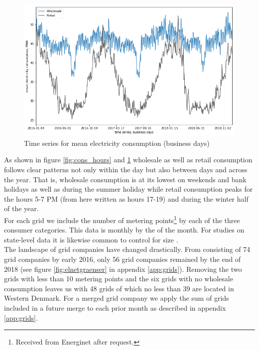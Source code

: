 \begin{figure}[H]
  \centering
  \caption{Time series for mean electricity consumption (business days)}
  \label{fig:cons_time_series}
  \includegraphics[width=1 \textwidth]{03_figures/cons_time series, business days}
\end{figure}
\noindent
As shown in figure \ref{fig:cons_hours} and \ref{fig:cons_time_series} wholesale as well as retail consumption follows clear patterns not only within the day but also between days and across the year. That is, wholesale consumption is at its lowest on weekends and bank holidays as well as during the summer holiday while retail consumption peaks for the hours 5-7 PM (from here written as hours 17-19) and during the winter half of the year.
\medskip\\
For each grid we include the number of metering points\footnote{Received from Energinet after request.} by each of the three consumer categories. This data is monthly by the  of the month. For studies on state-level data it is likewise common to control for size \citep{burke2017price}.
\medskip\\
The landscape of grid companies have changed drastically. From consisting of 74 grid companies by early 2016, only 56 grid companies remained by the end of 2018 (see figure \ref{fig:elnetgraenser} in appendix \ref{app:grids}). Removing the two grids with less than 10 metering points and the six grids with no wholesale consumption leaves us with 48 grids of which no less than 39 are located in Western Denmark. For a merged grid company we apply the sum of grids included in a future merge to each prior month as described in appendix \ref{app:grids}.


